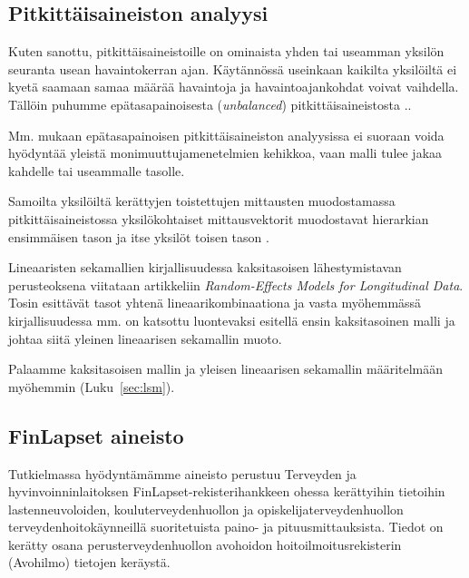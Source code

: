 \documentclass[finnish]{docopts}
\begin{document}
\subsection{Pitkittäisaineiston analyysi}
\label{sub:pitkittaisanal}

Kuten sanottu, pitkittäisaineistoille on ominaista yhden tai useamman yksilön seuranta usean havaintokerran ajan. Käytännössä useinkaan kaikilta yksilöiltä ei kyetä saamaan samaa määrää havaintoja ja havaintoajankohdat voivat vaihdella. Tällöin puhumme epätasapainoisesta (\textit{unbalanced}) pitkittäisaineistosta .\cite{laird82}.

Mm. \cite{verbeke00, goldstein11} mukaan epätasapainoisen pitkittäisaineiston analyysissa ei suoraan voida hyödyntää yleistä monimuuttujamenetelmien kehikkoa, vaan malli tulee jakaa kahdelle tai useammalle tasolle. 

Samoilta yksilöiltä kerättyjen toistettujen mittausten muodostamassa pitkittäisaineistossa yksilökohtaiset mittausvektorit muodostavat hierarkian ensimmäisen tason ja itse yksilöt toisen tason \cite{goldstein11}.


Lineaaristen sekamallien kirjallisuudessa kaksitasoisen lähestymistavan perusteoksena viitataan \cite{laird82} artikkeliin \textit{Random-Effects Models for Longitudinal Data}. Tosin \cite{laird82} esittävät tasot yhtenä lineaarikombinaationa ja vasta myöhemmässä kirjallisuudessa mm. \cite{verbeke00, talbott06} on katsottu luontevaksi esitellä ensin kaksitasoinen malli ja johtaa siitä \cite{laird82} yleinen lineaarisen sekamallin muoto.

Palaamme kaksitasoisen mallin ja yleisen lineaarisen sekamallin määritelmään myöhemmin (Luku~\ref{sec:lsm}).\\

\subsection{FinLapset aineisto}
\label{sub:finlapsetdata}

Tutkielmassa hyödyntämämme aineisto perustuu Terveyden ja hyvinvoinninlaitoksen FinLapset-rekisterihankkeen \cite{finlapsetrekisteri} ohessa kerättyihin tietoihin lastenneuvoloiden, kouluterveydenhuollon ja opiskelijaterveydenhuollon terveydenhoitokäynneillä suoritetuista paino- ja pituusmittauksista. Tiedot on kerätty osana perusterveydenhuollon avohoidon hoitoilmoitusrekisterin (Avohilmo) tietojen keräystä.\\
\end{document}
